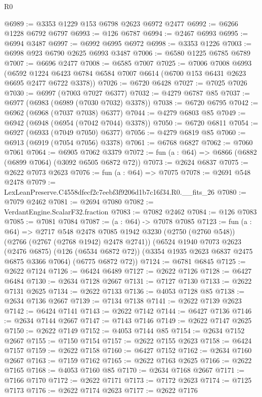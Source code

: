 \begin{lexlean}{R0}
\begin{coremodule}
@6989 := @3353 @1229 @153 @6798 @2623 @6972 @2477
@6992 := @6266 @1228 @6792 @6797
@6993 := @126 @6787
@6994 := @2467 @6993
@6995 := @6994 @3487
@6997 := @6992 @6995 @6972
@6998 := @3353 @1226
@7003 := @6998 @923 @6790 @2625 @6993 @3487
@7006 := @6580 @1225 @6785 @6789
@7007 := @6696 @2477
@7008 := @6585 @7007
@7025 := @7006
    @7008
    @6993
    (@6592 @1224 @6423 @6784 @6584 @7007 @6614 (@6700 @153 @6431 @2623 @6695 @2477 @6722 @3378))
@7026 := @6720 @6428
@7027 := @7025 @7026
@7030 := @6997 (@7003 @7027 @6377)
@7032 := @4279 @6787 @85
@7037 := @6977 (@6983 (@6989 (@7030 @7032) @3378))
@7038 := @6720 @6795
@7042 := @6962 (@6968 (@7037 @7038) @6377)
@7044 := @4279 @6803 @85
@7049 := @6942 (@6948 (@6954 (@7042 @7044) @3378))
@7050 := @6720 @6811
@7054 := @6927 (@6933 (@7049 @7050) @6377)
@7056 := @4279 @6819 @85
@7060 := @6913 (@6919 (@7054 @7056) @3378)
@7061 := @6768 @6827
@7062 := @7060 @7061
@7064 := @6905 @7062 @3379
@7072 := fun (a : @64) => @6866 (@6882 (@6899 @7064) (@3092 @6505 @6872 @72))
@7073 := @2624 @6837
@7075 := @2622 @7073 @2623
@7076 := fun (a : @64) => @7075
@7078 := @2691 @548 @2478
@7079 := LexLeanPreserve.C4558dfecf2c7eebf3f9206d1b7c16f34.R0.__fits_26
@7080 := @7079 @2462
@7081 := @2694 @7080
@7082 := VerdantEngine.ScalarF32.fraction
@7083 := @7082 @2462
@7084 := @126 @7083
@7085 := @7081 @7084
@7087 := (a : @64) -> @7078 @7085
@7123 := fun (a : @64) =>
  @2717
    @548
    @2478
    @7085
    @1942
    @3230
    (@2750 (@2760 @548))
    (@2766 (@2767 (@2768 @1942) @2478 @2741))
    (@6524
      @1940
      @7073
      @2623
      (@2476 @6875)
      (@126 (@6534 @6872 @72))
      (@3354 @1935 @2623 @6837 @2475 @6875 @3366 @7064)
      (@6775 @6872 @72))
@7124 := @6781 @6845
@7125 := @2622 @7124
@7126 := @6424 @6489
@7127 := @2622 @7126
@7128 := @6427 @6484
@7130 := @2634 @7128 @2667
@7131 := @7127 @7130
@7133 := @2622 @7131 @2625
@7134 := @2622 @7133
@7136 := @4053 @7128 @85
@7138 := @2634 @7136 @2667
@7139 := @7134 @7138
@7141 := @2622 @7139 @2623
@7142 := @6424 @7141
@7143 := @2622 @7142
@7144 := @6427 @7136
@7146 := @2634 @7144 @2667
@7147 := @7143 @7146
@7149 := @2622 @7147 @2625
@7150 := @2622 @7149
@7152 := @4053 @7144 @85
@7154 := @2634 @7152 @2667
@7155 := @7150 @7154
@7157 := @2622 @7155 @2623
@7158 := @6424 @7157
@7159 := @2622 @7158
@7160 := @6427 @7152
@7162 := @2634 @7160 @2667
@7163 := @7159 @7162
@7165 := @2622 @7163 @2625
@7166 := @2622 @7165
@7168 := @4053 @7160 @85
@7170 := @2634 @7168 @2667
@7171 := @7166 @7170
@7172 := @2622 @7171
@7173 := @7172 @2623
@7174 := @7125 @7173
@7176 := @2622 @7174 @2623
@7177 := @2622 @7176

\end{coremodule}
\end{lexlean}
